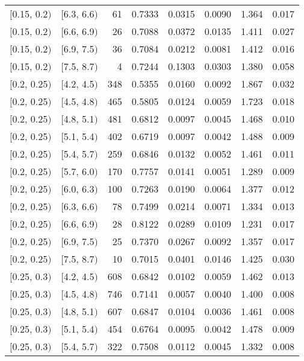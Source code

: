 \begin{longtable}{| l | l | r | r | r | r | r | r |}
        $[$0.15, 0.2$)$ & $[$6.3, 6.6$)$ & 61 & 0.7333 & 0.0315 & 0.0090 & 1.364 & 0.017 \\
        $[$0.15, 0.2$)$ & $[$6.6, 6.9$)$ & 26 & 0.7088 & 0.0372 & 0.0135 & 1.411 & 0.027 \\
        $[$0.15, 0.2$)$ & $[$6.9, 7.5$)$ & 36 & 0.7084 & 0.0212 & 0.0081 & 1.412 & 0.016 \\
        $[$0.15, 0.2$)$ & $[$7.5, 8.7$)$ & 4 & 0.7244 & 0.1303 & 0.0303 & 1.380 & 0.058 \\
        $[$0.2, 0.25$)$ & $[$4.2, 4.5$)$ & 348 & 0.5355 & 0.0160 & 0.0092 & 1.867 & 0.032 \\
        $[$0.2, 0.25$)$ & $[$4.5, 4.8$)$ & 465 & 0.5805 & 0.0124 & 0.0059 & 1.723 & 0.018 \\
        $[$0.2, 0.25$)$ & $[$4.8, 5.1$)$ & 481 & 0.6812 & 0.0097 & 0.0045 & 1.468 & 0.010 \\
        $[$0.2, 0.25$)$ & $[$5.1, 5.4$)$ & 402 & 0.6719 & 0.0097 & 0.0042 & 1.488 & 0.009 \\
        $[$0.2, 0.25$)$ & $[$5.4, 5.7$)$ & 259 & 0.6846 & 0.0132 & 0.0052 & 1.461 & 0.011 \\
        $[$0.2, 0.25$)$ & $[$5.7, 6.0$)$ & 170 & 0.7757 & 0.0141 & 0.0051 & 1.289 & 0.009 \\
        $[$0.2, 0.25$)$ & $[$6.0, 6.3$)$ & 100 & 0.7263 & 0.0190 & 0.0064 & 1.377 & 0.012 \\
        $[$0.2, 0.25$)$ & $[$6.3, 6.6$)$ & 78 & 0.7499 & 0.0214 & 0.0071 & 1.334 & 0.013 \\
        $[$0.2, 0.25$)$ & $[$6.6, 6.9$)$ & 28 & 0.8122 & 0.0289 & 0.0109 & 1.231 & 0.017 \\
        $[$0.2, 0.25$)$ & $[$6.9, 7.5$)$ & 25 & 0.7370 & 0.0267 & 0.0092 & 1.357 & 0.017 \\
        $[$0.2, 0.25$)$ & $[$7.5, 8.7$)$ & 10 & 0.7015 & 0.0401 & 0.0146 & 1.425 & 0.030 \\
        $[$0.25, 0.3$)$ & $[$4.2, 4.5$)$ & 608 & 0.6842 & 0.0102 & 0.0059 & 1.462 & 0.013 \\
        $[$0.25, 0.3$)$ & $[$4.5, 4.8$)$ & 746 & 0.7141 & 0.0057 & 0.0040 & 1.400 & 0.008 \\
        $[$0.25, 0.3$)$ & $[$4.8, 5.1$)$ & 607 & 0.6847 & 0.0104 & 0.0036 & 1.461 & 0.008 \\
        $[$0.25, 0.3$)$ & $[$5.1, 5.4$)$ & 454 & 0.6764 & 0.0095 & 0.0042 & 1.478 & 0.009 \\
        $[$0.25, 0.3$)$ & $[$5.4, 5.7$)$ & 322 & 0.7508 & 0.0112 & 0.0045 & 1.332 & 0.008 \\

\end{longtable}
